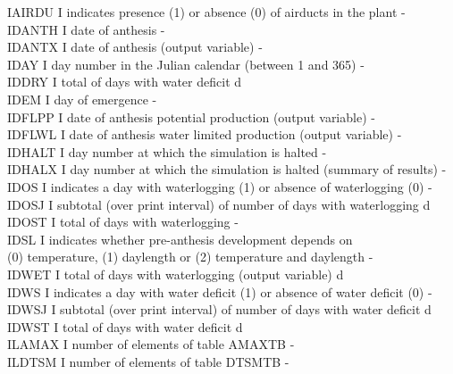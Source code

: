 \documentclass[11pt]{article}
\begin{document}
\begin{tabbing}
IAIRDU\> \> I\> indicates presence (1) or absence (0) of airducts in the plant\> \> \> \> \> \> \> -\\
IDANTH\> \> I\> date of anthesis\> \> \> \> \> \> \> -\\
IDANTX\> \> I\> date of anthesis (output variable)\> \> \> \> \> \> \> -\\
IDAY    \> \> I   \> day number in the Julian calendar (between 1 and 365)        \> \> \> \> \> \> \> -\\
IDDRY\> \> I\> total of days with water deficit\> \> \> \> \> \> \> d\\
IDEM\> \> I\> day of emergence\> \> \> \> \> \> \> -\\
IDFLPP\> \> I\> date of anthesis potential production (output variable)\> \> \> \> \> \> \> -\\
IDFLWL\> \> I\> date of anthesis water limited production (output variable)\> \> \> \> \> \> \> -\\
IDHALT\> \> I\> day number at which the simulation is halted\> \> \> \> \> \> \> -\\
IDHALX\> \> I\> day number at which the simulation is halted (summary of results)\> \> \> \> \> \> \> -\\
IDOS\> \> I\> indicates a day with waterlogging (1) or absence of waterlogging (0)\> \> \> \> \> \> \> -\\
IDOSJ\> \> I\> subtotal (over print interval) of number of days with waterlogging\> \> \> \> \> \> \> d\\
IDOST\> \> I\> total of days with waterlogging\> \> \> \> \> \> \> -\\
IDSL\> \> I\> indicates whether pre-anthesis development depends on \\
\>\> \> (0) temperature, (1) daylength or (2) temperature and daylength\> \> \> \> \> \> \> -\\
IDWET\> \> I\> total of days with waterlogging (output variable)\> \> \> \> \> \> \> d\\
IDWS\> \> I\> indicates a day with water deficit (1) or absence of water deficit (0)\> \> \> \> \> \> \> -\\
IDWSJ\> \> I\> subtotal (over print interval) of number of days with water deficit\> \> \> \> \> \> \> d\\
IDWST\> \> I\> total of days with water deficit\> \> \> \> \> \> \> d\\
ILAMAX\> \> I\> number of elements of table AMAXTB\> \> \> \> \> \> \> -\\
ILDTSM\> \> I\> number of elements of table DTSMTB\> \> \> \> \> \> \> -\\

\end{tabbing}
\end{document}
